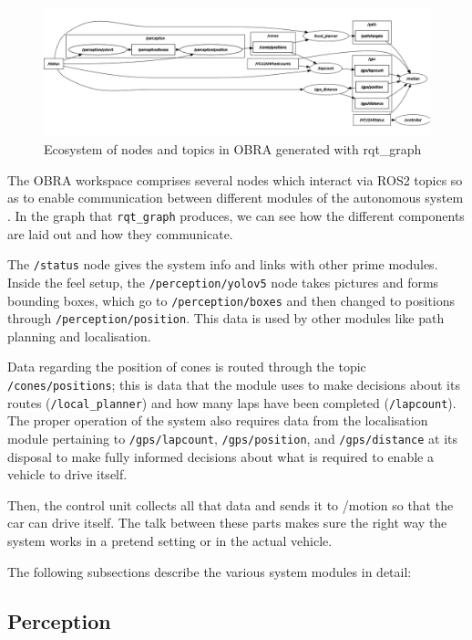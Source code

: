 \documentclass[a4paper,11pt]{report}
\begin{document}
\begin{figure}[h]
    \centering
    \includegraphics[width=\textwidth]{Images/wsgraph.png}
    \caption{Ecosystem of nodes and topics in OBRA generated with rqt\_graph}
    \label{fig:obra_graph}
\end{figure}

The OBRA workspace comprises several nodes which interact via ROS2 topics so as to enable communication 
between different modules of the autonomous system \cite{reference15}. In the graph that \texttt{rqt\_graph} produces, 
we can see how the different components are laid out and how they communicate.

The \texttt{/status} node gives the system info and links with other prime modules. 
Inside the feel setup, the \texttt{/perception/yolov5} node takes pictures and forms bounding boxes, 
which go to \texttt{/perception/boxes} and then changed to positions through \texttt{/perception/position}. 
This data is used by other modules like path planning and localisation.

Data regarding the position of cones is routed through the topic \texttt{/cones/positions}; 
this is data that the module uses to make decisions about its routes (\texttt{/local\_planner}) and 
how many laps have been completed (\texttt{/lapcount}). The proper operation of the system also requires 
data from the localisation module pertaining to \texttt{/gps/lapcount}, \texttt{/gps/position}, 
and \texttt{/gps/distance} at its disposal to make fully informed decisions about what is required to enable a vehicle to drive itself.

Then, the control unit collects all that data and sends it to /motion so that the car can drive itself. 
The talk between these parts makes sure the right way the system works in a pretend setting or in the actual vehicle.

The following subsections describe the various system modules in detail:

\subsection{Perception}
\end{document}
